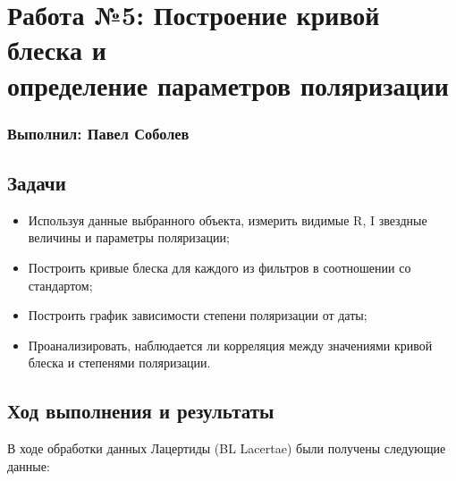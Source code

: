 




\section*{Работа №5: Построение кривой блеска и \\ определение параметров поляризации}
\subsubsection*{Выполнил: Павел Соболев}

\vspace{3em}

\subsection*{Задачи}

\begin{itemize}
  \setlength\itemsep{-0.1em}
  \item Используя данные выбранного объекта, измерить видимые R, I звездные величины и параметры поляризации;
  \item Построить кривые блеска для каждого из фильтров в соотношении со стандартом;
  \item Построить график зависимости степени поляризации от даты;
  \item Проанализировать, наблюдается ли корреляция между значениями кривой блеска и степенями поляризации.
\end{itemize}

\subsection*{Ход выполнения и результаты}

В ходе обработки данных Лацертиды (BL Lacertae) были получены следующие данные:

